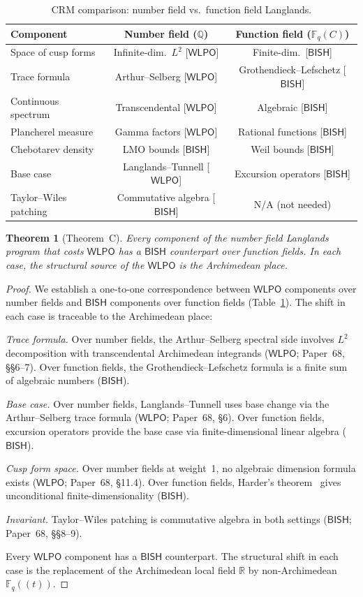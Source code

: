 \documentclass[11pt]{article}
\theoremstyle{plain}
\newtheorem{theorem}{Theorem}[section]
\theoremstyle{definition}
\theoremstyle{remark}
\newcommand{\Q}{\mathbb{Q}}
\newcommand{\R}{\mathbb{R}}
\newcommand{\Fq}{\mathbb{F}_q}
\newcommand{\BISH}{\mathsf{BISH}}
\newcommand{\WLPO}{\mathsf{WLPO}}
\begin{document}
\begin{table}[ht]
\centering
\caption{CRM comparison: number field vs.\ function field Langlands.}
\label{tab:comparison}
\begin{tabular}{@{}lcc@{}}
\toprule
\textbf{Component} & \textbf{Number field} ($\Q$) & \textbf{Function field} ($\Fq(C)$) \\
\midrule
Space of cusp forms & Infinite-dim.\ $L^2$ [$\WLPO$] & Finite-dim.\ [$\BISH$] \\
Trace formula & Arthur--Selberg [$\WLPO$] & Grothendieck--Lefschetz [$\BISH$] \\
Continuous spectrum & Transcendental [$\WLPO$] & Algebraic [$\BISH$] \\
Plancherel measure & Gamma factors [$\WLPO$] & Rational functions [$\BISH$] \\
Chebotarev density & LMO bounds [$\BISH$] & Weil bounds [$\BISH$] \\
Base case & Langlands--Tunnell [$\WLPO$] & Excursion operators [$\BISH$] \\
Taylor--Wiles patching & Commutative algebra [$\BISH$] & N/A (not needed) \\
\bottomrule
\end{tabular}
\end{table}

\begin{theorem}[Theorem~C]\label{thm:R}
Every component of the number field Langlands program that costs $\WLPO$ has a
$\BISH$ counterpart over function fields. In each case, the structural source
of the $\WLPO$ is the Archimedean place.
\end{theorem}

\begin{proof}
We establish a one-to-one correspondence between $\WLPO$ components over
number fields and $\BISH$ components over function fields
(Table~\ref{tab:comparison}). The shift in each case is traceable to the
Archimedean place:

\emph{Trace formula.} Over number fields, the Arthur--Selberg spectral side
involves $L^2$ decomposition with transcendental Archimedean integrands
($\WLPO$; Paper~68, \S\S6--7). Over function fields, the
Grothendieck--Lefschetz formula is a finite sum of algebraic numbers ($\BISH$).

\emph{Base case.} Over number fields, Langlands--Tunnell uses base change
via the Arthur--Selberg trace formula ($\WLPO$; Paper~68, \S6). Over function
fields, excursion operators provide the base case via finite-dimensional linear
algebra ($\BISH$).

\emph{Cusp form space.} Over number fields at weight~1, no algebraic dimension
formula exists ($\WLPO$; Paper~68, \S11.4). Over function fields, Harder's
theorem~\cite{Harder74} gives unconditional finite-dimensionality ($\BISH$).

\emph{Invariant.} Taylor--Wiles patching is commutative algebra in both
settings ($\BISH$; Paper~68, \S\S8--9).

Every $\WLPO$ component has a $\BISH$ counterpart. The structural shift in each
case is the replacement of the Archimedean local field $\R$ by non-Archimedean
$\Fq((t))$.
\end{proof}
\end{document}
